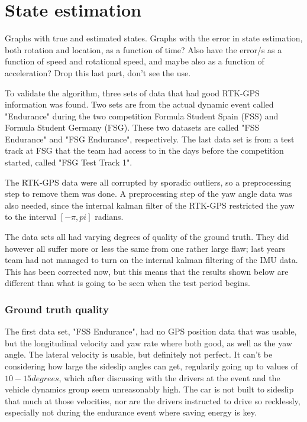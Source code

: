 \section{State estimation}

Graphs with true and estimated states. Graphs with the error in state estimation, both rotation and location, as a function of time? Also have the error/s as a function of speed and rotational speed, and maybe also as a function of acceleration? Drop this last part, don't see the use. 

To validate the algorithm, three sets of data that had good RTK-GPS information was found. Two sets are from the actual dynamic event called "Endurance" during the two competition Formula Student Spain (FSS) and Formula Student Germany (FSG). These two datasets are called "FSS Endurance" and "FSG Endurance", respectively. The last data set is from a test track at FSG that the team had access to in the days before the competition started, called "FSG Test Track 1". 

The RTK-GPS data were all corrupted by sporadic outliers, so a preprocessing step to remove them was done. A preprocessing step of the yaw angle data was also needed, since the internal kalman filter of the RTK-GPS restricted the yaw to the interval $[-\pi,pi]$ radians. 

The data sets all had varying degrees of quality of the ground truth. They did however all suffer more or less the same from one rather large flaw; last years team had not managed to turn on the internal kalman filtering of the IMU data. This has been corrected now, but this means that the results shown below are different than what is going to be seen when the test period begins. 

\subsubsection{Ground truth quality}

The first data set, "FSS Endurance", had no GPS position data that was usable, but the longitudinal velocity and yaw rate where both good, as well as the yaw angle. The lateral velocity is usable, but definitely not perfect. It can't be considering how large the sideslip angles can get, regularily going up to values of $10-15 degrees$, which after discussing with the drivers at the event and the vehicle dynamics group seem unreasonably high. The car is not built to sideslip that much at those velocities, nor are the drivers instructed to drive so recklessly, especially not during the endurance event where saving energy is key. 


